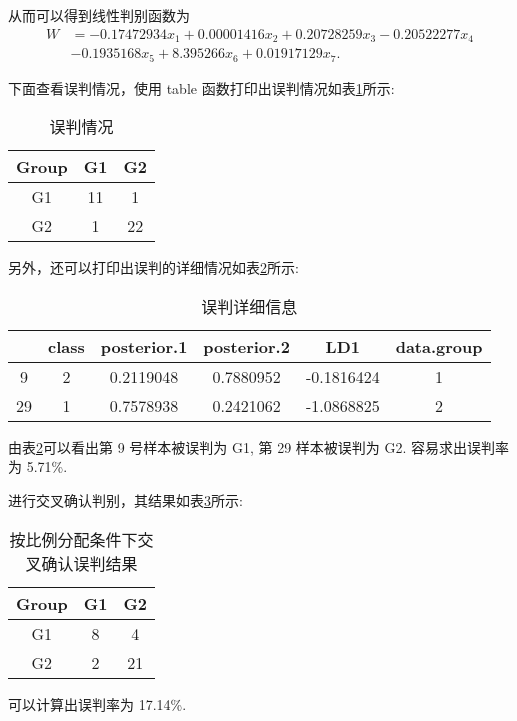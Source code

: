 \documentclass{ctexrep}
\begin{document}
从而可以得到线性判别函数为
\begin{equation*}
\begin{aligned}
W&=-0.17472934x_1+0.00001416x_2+0.20728259x_3-0.20522277x_4 \\
&-0.1935168x_5+8.395266x_6+0.01917129x_7.
\end{aligned}
\end{equation*}

下面查看误判情况，使用 table 函数打印出误判情况如表\ref{tab:ex541}所示:
\begin{table}[h!]
\begin{center}
\begin{tabular}{c|cc}
Group & G1 & G2 \\
\hline
G1 & 11 & 1 \\
G2 & 1 & 22
\end{tabular}
\end{center}
\caption{误判情况}
\label{tab:ex541}
\end{table}

另外，还可以打印出误判的详细情况如表\ref{tab:ex542}所示:
\begin{table}[hb!]
\begin{center}
\begin{tabular}{c|ccccc}
 & class & posterior.1 & posterior.2 & LD1 & data.group \\
\hline
9 & 2 & 0.2119048 & 0.7880952 & -0.1816424 & 1 \\
29 & 1 & 0.7578938 & 0.2421062 & -1.0868825 & 2
\end{tabular}
\end{center}
\caption{误判详细信息}
\label{tab:ex542}
\end{table}

由表\ref{tab:ex542}可以看出第 9 号样本被误判为 G1, 第 29 样本被误判为 G2. 容易求出误判率为 5.71\%.

进行交叉确认判别，其结果如表\ref{tab:ex543}所示:
\begin{table}[ht!]
\begin{center}
\begin{tabular}{c|cc}
Group & G1 & G2 \\
\hline
G1 & 8 & 4 \\
G2 & 2 & 21
\end{tabular}
\end{center}
\caption{按比例分配条件下交叉确认误判结果}
\label{tab:ex543}
\end{table}

可以计算出误判率为 17.14\%.
\end{document}
